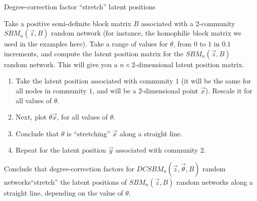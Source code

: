 \begin{floatingbox}[h]\caption{Degree-correction factor ``stretch'' latent positions}
\label{box:ch5:psd_block:stretch}
Take a positive semi-definite block matrix $B$ associated with a $2$-community $SBM_n(\vec z, B)$ random network (for instance, the homophilic block matrix we used in the examples here). Take a range of values for $\theta$, from $0$ to $1$ in $0.1$ increments, and compute the latent position matrix for the $SBM_n(\vec z, B)$ random network. This will give you a $n \times 2$-dimensional latent position matrix.
\begin{enumerate}
    \item Take the latent position associated with community $1$ (it will be the same for all nodes in community $1$, and will be a $2$-dimensional point $\vec x$). Rescale it for all values of $\theta$. 
    \item Next, plot $\theta \vec x$, for all values of $\theta$. 
    \item Conclude that $\theta$ is ``stretching'' $\vec x$ along a straight line.
    \item Repeat for the latent position $\vec y$ associated with community $2$.
\end{enumerate}
Conclude that degree-correction factors for $DCSBM_n(\vec z, \vec \theta, B)$ random networks``stretch'' the latent positions of $SBM_n(\vec z, B)$ random networks along a straight line, depending on the value of $\theta$. 
\end{floatingbox}